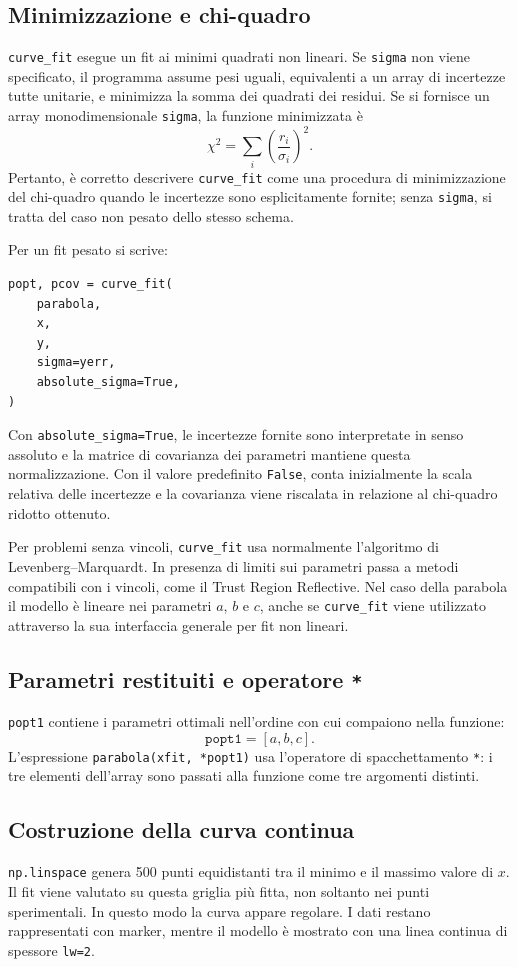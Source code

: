 \documentclass[11pt,a4paper]{book}
\begin{document}
\subsection{Minimizzazione e chi-quadro}
\texttt{curve\_fit} esegue un fit ai minimi quadrati non lineari. Se \texttt{sigma} non viene specificato, il programma assume pesi uguali, equivalenti a un array di incertezze tutte unitarie, e minimizza la somma dei quadrati dei residui. Se si fornisce un array monodimensionale \texttt{sigma}, la funzione minimizzata è
\[
 \chi^2=\sum_i\left(\frac{r_i}{\sigma_i}\right)^2.
\]
Pertanto, è corretto descrivere \texttt{curve\_fit} come una procedura di minimizzazione del chi-quadro quando le incertezze sono esplicitamente fornite; senza \texttt{sigma}, si tratta del caso non pesato dello stesso schema.

Per un fit pesato si scrive:
\begin{lstlisting}
popt, pcov = curve_fit(
    parabola,
    x,
    y,
    sigma=yerr,
    absolute_sigma=True,
)
\end{lstlisting}
Con \texttt{absolute\_sigma=True}, le incertezze fornite sono interpretate in senso assoluto e la matrice di covarianza dei parametri mantiene questa normalizzazione. Con il valore predefinito \texttt{False}, conta inizialmente la scala relativa delle incertezze e la covarianza viene riscalata in relazione al chi-quadro ridotto ottenuto.

Per problemi senza vincoli, \texttt{curve\_fit} usa normalmente l'algoritmo di Levenberg--Marquardt. In presenza di limiti sui parametri passa a metodi compatibili con i vincoli, come il Trust Region Reflective. Nel caso della parabola il modello è lineare nei parametri $a$, $b$ e $c$, anche se \texttt{curve\_fit} viene utilizzato attraverso la sua interfaccia generale per fit non lineari.

\subsection{Parametri restituiti e operatore \texttt{*}}
\texttt{popt1} contiene i parametri ottimali nell'ordine con cui compaiono nella funzione:
\[
 \texttt{popt1}=[a,b,c].
\]
L'espressione \texttt{parabola(xfit, *popt1)} usa l'operatore di spacchettamento \texttt{*}: i tre elementi dell'array sono passati alla funzione come tre argomenti distinti.

\subsection{Costruzione della curva continua}
\texttt{np.linspace} genera 500 punti equidistanti tra il minimo e il massimo valore di $x$. Il fit viene valutato su questa griglia più fitta, non soltanto nei punti sperimentali. In questo modo la curva appare regolare. I dati restano rappresentati con marker, mentre il modello è mostrato con una linea continua di spessore \texttt{lw=2}.
\end{document}
